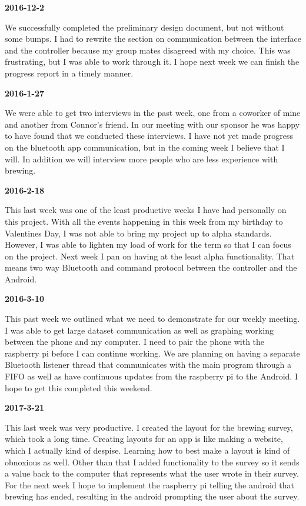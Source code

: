 \textbf{2016-12-2} 

We successfully completed the preliminary design document, but not without some bumps. I had to rewrite the section on communication between the interface and the controller because my group mates disagreed with my choice. This was frustrating, but I was able to work through it. I hope next week we can finish the progress report in a timely manner.

\textbf{2016-1-27} 

We were able to get two interviews in the past week, one from a coworker of mine and another from Connor's friend. In our meeting with our sponsor he was happy to have found that we conducted these interviews. I have not yet made progress on the bluetooth app communication, but in the coming week I believe that I will. In addition we will interview more people who are less experience with brewing.

\textbf{2016-2-18} 

This last week was one of the least productive weeks I have had personally on this project. With all the events happening in this week from my birthday to Valentines Day, I was not able to bring my project up to alpha standards. However, I was able to lighten my load of work for the term so that I can focus on the project. Next week I pan on having at the least alpha functionality. That means two way Bluetooth and command protocol between the controller and the Android.

\textbf{2016-3-10} 

This past week we outlined what we need to demonstrate for our weekly meeting. I was able to get large dataset communication as well as graphing working between the phone and my computer. I need to pair the phone with the raspberry pi before I can continue working. We are planning on having a separate Bluetooth listener thread that communicates with the main program through a FIFO as well as have continuous updates from the raspberry pi to the Android. I hope to get this completed this weekend.

\textbf{2017-3-21} 

This last week was very productive. I created the layout for the brewing survey, which took a long time. Creating layouts for an app is like making a website, which I actually kind of despise. Learning how to best make a layout is kind of obnoxious as well. Other than that I added functionality to the survey so it sends a value back to the computer that represents what the user wrote in their survey. For the next week I hope to implement the raspberry pi telling the android that brewing has ended, resulting in the android prompting the user about the survey.

